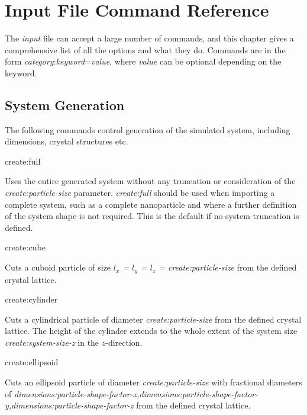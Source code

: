 \chapter{Input File Command Reference}\label{chap:InputFileCommandReference}
The \textit{input} file can accept a large number of commands, and this chapter gives a comprehensive list of all the options and what they do. Commands are in the form \textit{category}:\textit{keyword}=\textit{value}, where \textit{value} can be optional depending on the keyword.

\section*{System Generation}
The following commands control generation of the simulated system, including dimensions, crystal structures etc. \\ \par

{\zicf create:full} Uses the entire generated system without any truncation or consideration of the \textit{create:particle-size} parameter. \textit{create:full} should be used when importing a complete system, such as a complete nanoparticle and where a further definition of the system shape is not required. This is the default if no system truncation is defined.\\ \par

{\zicf create:cube} Cuts a cuboid particle of size \textit{$l_x$ = $l_y$ = $l_z$ = create:particle-size} from the defined crystal lattice.\\ \par

{\zicf create:cylinder} Cuts a cylindrical particle of diameter \textit{create:particle-size} from the defined crystal lattice. The height of the cylinder extends to the whole extent of the system size \textit{create:system-size-z} in the $z$-direction. \\ \par

{\zicf create:ellipsoid} Cuts an ellipsoid particle of diameter \textit{create:particle-size} with fractional diameters of \textit{dimensions:particle-shape-factor-x,dimensions:particle-shape-factor-y,dimensions:particle-shape-factor-z} from the defined crystal lattice.\\ \par

